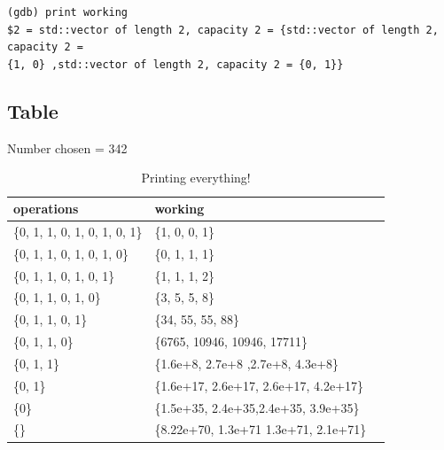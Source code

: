 \documentclass[answers]{exam}
\theoremstyle{definition}
\begin{document}
\verb|(gdb) print working|\\
\verb|$2 = std::vector of length 2, capacity 2 = {std::vector of length 2, capacity 2 =|\\
\verb|{1, 0} ,std::vector of length 2, capacity 2 = {0, 1}}|
\subsection{Table}
Number chosen = 342
\begin{table}[H]
\begin{tabularx}{0.8\textwidth} { 
  | >{\raggedright\arraybackslash}X 
  | >{\centering\arraybackslash}X 
  | >{\raggedleft\arraybackslash}X | }
 \hline
 \textbf{operations} & \textbf{working} \\ 
 \hline
 \{0, 1, 1, 0, 1, 0, 1, 0, 1\} & \{1, 0, 0, 1\} \\ 
 \hline
 \{0, 1, 1, 0, 1, 0, 1, 0\} & \{0, 1, 1, 1\} \\ 
 \hline
 \{0, 1, 1, 0, 1, 0, 1\} & \{1, 1, 1, 2\} \\ 
 \hline
 \{0, 1, 1, 0, 1, 0\} & \{3, 5, 5, 8\} \\ 
 \hline
 \{0, 1, 1, 0, 1\} & \{34, 55, 55, 88\} \\ 
 \hline
 \{0, 1, 1, 0\} & \{6765, 10946, 10946, 17711\} \\ 
 \hline
 \{0, 1, 1\} & \{1.6e+8, 2.7e+8 ,2.7e+8, 4.3e+8\} \\ 
 \hline
 \{0, 1\} & \{1.6e+17, 2.6e+17, 2.6e+17, 4.2e+17\} \\ 
 \hline
 \{0\} & \{1.5e+35,
    2.4e+35,2.4e+35, 3.9e+35\} \\ 
 \hline
 \{\} & \{8.22e+70,
    1.3e+71 1.3e+71, 2.1e+71\} \\ 
 \hline
\end{tabularx}
\caption{Printing everything!}
\end{table}
\end{document}
